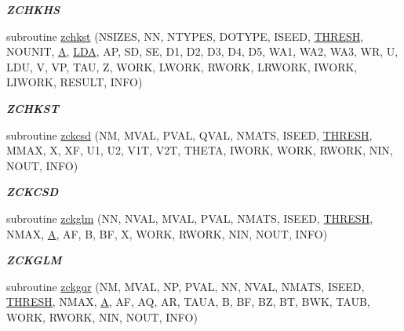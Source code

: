 \begin{DoxyCompactItemize}
\begin{DoxyCompactList}\small\item\em {\bfseries Z\+C\+H\+K\+H\+S} \end{DoxyCompactList}\item 
subroutine \hyperlink{group__complex16__eig_ga23b67e5ea0fd86a8df3a60703acabef0}{zchkst} (N\+S\+I\+Z\+E\+S, N\+N, N\+T\+Y\+P\+E\+S, D\+O\+T\+Y\+P\+E, I\+S\+E\+E\+D, \hyperlink{zlaqgs_8c_a0656018abfc9fa2821827415f5d5ea57}{T\+H\+R\+E\+S\+H}, N\+O\+U\+N\+I\+T, \hyperlink{classA}{A}, \hyperlink{example__user_8c_ae946da542ce0db94dced19b2ecefd1aa}{L\+D\+A}, A\+P, S\+D, S\+E, D1, D2, D3, D4, D5, W\+A1, W\+A2, W\+A3, W\+R, U, L\+D\+U, V, V\+P, T\+A\+U, Z, W\+O\+R\+K, L\+W\+O\+R\+K, R\+W\+O\+R\+K, L\+R\+W\+O\+R\+K, I\+W\+O\+R\+K, L\+I\+W\+O\+R\+K, R\+E\+S\+U\+L\+T, I\+N\+F\+O)
\begin{DoxyCompactList}\small\item\em {\bfseries Z\+C\+H\+K\+S\+T} \end{DoxyCompactList}\item 
subroutine \hyperlink{group__complex16__eig_ga0e8297dde284d708a45b7934df36470e}{zckcsd} (N\+M, M\+V\+A\+L, P\+V\+A\+L, Q\+V\+A\+L, N\+M\+A\+T\+S, I\+S\+E\+E\+D, \hyperlink{zlaqgs_8c_a0656018abfc9fa2821827415f5d5ea57}{T\+H\+R\+E\+S\+H}, M\+M\+A\+X, X, X\+F, U1, U2, V1\+T, V2\+T, T\+H\+E\+T\+A, I\+W\+O\+R\+K, W\+O\+R\+K, R\+W\+O\+R\+K, N\+I\+N, N\+O\+U\+T, I\+N\+F\+O)
\begin{DoxyCompactList}\small\item\em {\bfseries Z\+C\+K\+C\+S\+D} \end{DoxyCompactList}\item 
subroutine \hyperlink{group__complex16__eig_ga93ce24d5c1333291a37deb1d10bae67b}{zckglm} (N\+N, N\+V\+A\+L, M\+V\+A\+L, P\+V\+A\+L, N\+M\+A\+T\+S, I\+S\+E\+E\+D, \hyperlink{zlaqgs_8c_a0656018abfc9fa2821827415f5d5ea57}{T\+H\+R\+E\+S\+H}, N\+M\+A\+X, \hyperlink{classA}{A}, A\+F, B, B\+F, X, W\+O\+R\+K, R\+W\+O\+R\+K, N\+I\+N, N\+O\+U\+T, I\+N\+F\+O)
\begin{DoxyCompactList}\small\item\em {\bfseries Z\+C\+K\+G\+L\+M} \end{DoxyCompactList}\item 
subroutine \hyperlink{group__complex16__eig_gac50da824da9466bc66bfe055ebd480ae}{zckgqr} (N\+M, M\+V\+A\+L, N\+P, P\+V\+A\+L, N\+N, N\+V\+A\+L, N\+M\+A\+T\+S, I\+S\+E\+E\+D, \hyperlink{zlaqgs_8c_a0656018abfc9fa2821827415f5d5ea57}{T\+H\+R\+E\+S\+H}, N\+M\+A\+X, \hyperlink{classA}{A}, A\+F, A\+Q, A\+R, T\+A\+U\+A, B, B\+F, B\+Z, B\+T, B\+W\+K, T\+A\+U\+B, W\+O\+R\+K, R\+W\+O\+R\+K, N\+I\+N, N\+O\+U\+T, I\+N\+F\+O)

\end{DoxyCompactItemize}
